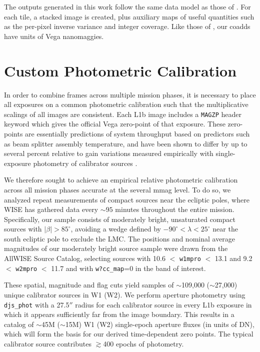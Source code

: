 \documentclass{emulateapj}
\begin{document}
The outputs generated in this work follow the same data model as those of 
\cite{lang14}. For each tile, a stacked image is created, plus auxiliary
maps of useful quantities such as the per-pixel inverse variance and integer 
coverage. Like those of \cite{lang14}, our coadds have units of Vega 
nanomaggies.

\section{Custom Photometric Calibration}
\label{sec:calib}
In order to combine frames across multiple mission phases, it is necessary
to place all exposures on a common photometric calibration such that
the multiplicative scalings of all images are consistent. Each L1b
image includes a \verb|MAGZP| header keyword which gives the official
Vega zero-point of that exposure. These zero-points are essentially
predictions of system throughput based on predictors such as beam splitter
assembly temperature, and have been shown to differ by up to several percent 
relative to gain variations measured empirically with single-exposure
photometry of calibrator sources \citep{cutri13, cutri15}.

We therefore sought to achieve an empirical relative photometric calibration
across all mission phases accurate at the several mmag level. To do so, we 
analyzed repeat measurements of compact sources near the 
ecliptic poles, where WISE has gathered data every $\sim$$95$ minutes 
throughout the entire mission. Specifically, our sample consists of moderately 
bright, unsaturated compact sources with $|\beta| > 85^{\circ}$, avoiding a 
wedge defined by $-90^{\circ}$$<$$\lambda$$<25^{\circ}$ near the south ecliptic
pole to exclude the LMC. The positions and nominal average magnitudes of our 
moderately bright source sample were drawn from the AllWISE Source Catalog, 
selecting sources with 10.6 $<$ \verb|w1mpro| $<$ 13.1 and 9.2 $<$ 
\verb|w2mpro| $<$ 11.7 and with \verb|w?cc_map|=0 in the band of interest.

These spatial, magnitude and flag cuts yield samples of $\sim$109,000 
($\sim$27,000) unique calibrator sources in W1 (W2). We perform aperture 
photometry using \verb|djs_phot| with a 27.5$''$ radius for each calibrator 
source in every L1b exposure in which it appears sufficiently far from the 
image boundary. This results in a catalog of $\sim$45M ($\sim$15M) W1 (W2) 
single-epoch aperture fluxes (in units of DN), which will form the basis for 
our derived time-dependent zero points. The typical calibrator source 
contributes $\gtrsim$400 epochs of photometry.
\end{document}
